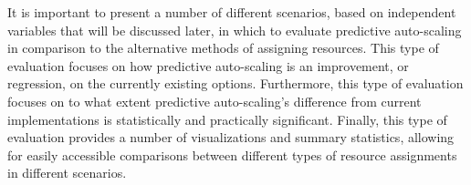 It is important to present a number of different
scenarios, based on independent variables that will be discussed later, in which
to evaluate predictive auto-scaling in comparison to the alternative methods
of assigning resources. This type of evaluation focuses on how predictive
auto-scaling is an improvement, or regression, on the currently existing
options. Furthermore, this type of evaluation focuses on to what extent
predictive auto-scaling's difference from current implementations
is statistically and practically significant. Finally, this type of evaluation
provides a number of visualizations and summary statistics, allowing for
easily accessible comparisons between different types of resource assignments
in different scenarios.
